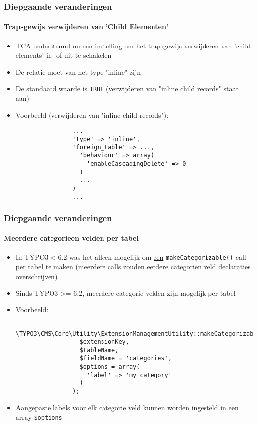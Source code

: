 
\begin{frame}[fragile]
	\frametitle{Diepgaande veranderingen}
	\framesubtitle{Trapsgewijs verwijderen van 'Child Elementen'}

	\begin{itemize}
		\item TCA ondersteund nu een instelling om  het trapsgewijs verwijderen van 'child elements' in- of uit te schakelen
		\item De relatie moet van het type "inline" zijn
		\item De standaard waarde is \texttt{TRUE} (verwijderen van "inline child records" staat aan)
		\item Voorbeeld (verwijderen van "inline child records"):

			\begin{lstlisting}
				...
				'type' => 'inline',
				'foreign_table' => ...,
				  'behaviour' => array(
				    'enableCascadingDelete' => 0
				  )
				  ...
				)
				...
			\end{lstlisting}

	\end{itemize}

\end{frame}


\begin{frame}[fragile]
	\frametitle{Diepgaande veranderingen}
	\framesubtitle{Meerdere categorieen velden per tabel}

	\begin{itemize}
		\item In TYPO3 < 6.2 was het alleen mogelijk om \underline{een} \texttt{makeCategorizable()} call per tabel te maken
			(meerdere calls zouden eerdere categorien veld declaraties overschrijven)
		\item Sinds TYPO3 >= 6.2, meerdere categorie velden zijn mogelijk per tabel
		\item Voorbeeld:

			\begin{lstlisting}
				\TYPO3\CMS\Core\Utility\ExtensionManagementUtility::makeCategorizable(
				  $extensionKey,
				  $tableName,
				  $fieldName = 'categories',
				  $options = array(
				  	'label' => 'my category'
				  )
				);
			\end{lstlisting}

		\item Aangepaste labels voor elk categorie veld kunnen worden ingesteld in een array \texttt{\$options}

	\end{itemize}

\end{frame}

